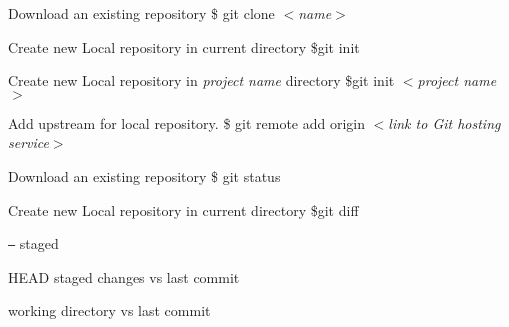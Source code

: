\documentclass[twocolumn]{article}
\begin{document}
\begin{tcolorbox}[ titleBox, title=SETUP]
\begin{tcolorbox}[innerBox]
Download an existing repository
\tcblower
\$ git clone $<$\textit{name}$>$
\end{tcolorbox}

\begin{tcolorbox}[innerBox]
Create new Local repository in current directory
\tcblower
\$git init
\end{tcolorbox}

\begin{tcolorbox}[innerBox]
Create new Local repository in \textit{project name} directory
\tcblower
\$git init $<$\textit{project name}$>$
\end{tcolorbox}

\begin{tcolorbox}[innerBox]
Add upstream for local repository.
\tcblower
\$ git remote add origin $<$\textit{link to Git hosting service}$>$
\end{tcolorbox}
\end{tcolorbox}


\begin{tcolorbox}[ titleBox, title=SNAPSHOT]
\begin{tcolorbox}[innerBox]
Download an existing repository
\tcblower
\$ git status
\end{tcolorbox}

\begin{tcolorbox}[innerBox]
Create new Local repository in current directory
\tcblower
\$git diff
\end{tcolorbox}

\begin{tcolorbox}[splitBox, lefthand ratio=0.25, fontupper = \small, fontlower = \small]
\texttt{--}  staged 
\vspace{3mm}

HEAD
\tcblower
staged changes vs last commit
\par\vspace{3mm}
working directory vs last commit

\end{tcolorbox}
\end{tcolorbox}
\end{document}
